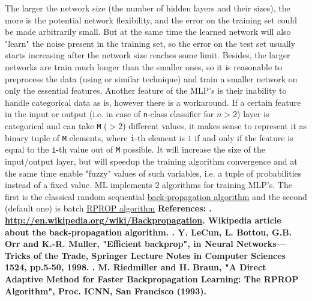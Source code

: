 \newline
\newline
The larger the network size (the number of hidden layers and their sizes), the more is the potential network flexibility, and the error on the training set could be made arbitrarily small. But at the same time the learned network will also "learn" the noise present in the training set, so the error on the test set usually starts increasing after the network size reaches some limit. Besides, the larger networks are train much longer than the smaller ones, so it is reasonable to preprocess the data (using  or similar technique) and train a smaller network on only the essential features.
\newline
\newline
Another feature of the MLP's is their inability to handle categorical data as is, however there is a workaround. If a certain feature in the input or output (i.e. in case of \texttt{n}-class classifier for \texttt{$n>2$}) layer is categorical and can take \texttt{M} ($>2$) different values, it makes sense to represent it as binary tuple of \texttt{M} elements, where \texttt{i}-th element is $1$ if and only if the feature is equal to the \texttt{i}-th value out of \texttt{M} possible. It will increase the size of the input/output layer, but will speedup the training algorithm convergence and at the same time enable "fuzzy" values of such variables, i.e. a tuple of probabilities instead of a fixed value.
\newline
\newline
ML implements $2$ algorithms for training MLP's. The first is the classical random sequential \href{#paper_backprop}{back-propagation algorithm} and the second (default one) is batch \href{#paper_rprop}{RPROP algorithm}
\newline
\newline
\textbf{References:
. \url{http://en.wikipedia.org/wiki/Backpropagation}. Wikipedia article about the back-propagation algorithm.
. Y. LeCun, L. Bottou, G.B. Orr and K.-R. Muller, "Efficient backprop", in Neural Networks---Tricks of the Trade, Springer Lecture Notes in Computer Sciences 1524, pp.5-50, 1998.
. M. Riedmiller and H. Braun, "A Direct Adaptive Method for Faster Backpropagation Learning: The RPROP Algorithm", Proc. ICNN, San Francisco (1993).}



